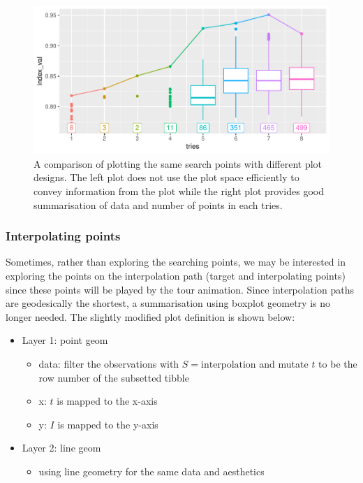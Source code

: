 \documentclass[12pt]{article}
\providecommand{\tightlist}{%
  \setlength{\itemsep}{0pt}\setlength{\parskip}{0pt}}
\begin{document}
\begin{figure}
\centering
\includegraphics{paper_files/figure-latex/points-tries-1.pdf}
\caption{\label{points}A comparison of plotting the same search points
with different plot designs. The left plot does not use the plot space
efficiently to convey information from the plot while the right plot
provides good summarisation of data and number of points in each tries.}
\end{figure}

\hypertarget{interpolating-points}{%
\subsubsection{Interpolating points}\label{interpolating-points}}

Sometimes, rather than exploring the searching points, we may be
interested in exploring the points on the interpolation path (target and
interpolating points) since these points will be played by the tour
animation. Since interpolation paths are geodesically the shortest, a
summarisation using boxplot geometry is no longer needed. The slightly
modified plot definition is shown below:

\begin{itemize}
\tightlist
\item
  Layer 1: point geom

  \begin{itemize}
  \tightlist
  \item
    data: filter the observations with \(S = \text{interpolation}\) and
    mutate \(t\) to be the row number of the subsetted tibble
  \item
    x: \(t\) is mapped to the x-axis
  \item
    y: \(I\) is mapped to the y-axis
  \end{itemize}
\item
  Layer 2: line geom

  \begin{itemize}
  \tightlist
  \item
    using line geometry for the same data and aesthetics
  \end{itemize}
\end{itemize}
\end{document}
